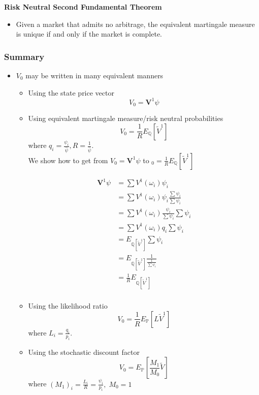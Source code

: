 \documentclass[11pt]{article}
\begin{document}
\textbf{Risk Neutral Second Fundamental Theorem}
\begin{itemize}
    \item Given a market that admits no arbitrage, the equivalent martingale measure is unique 
    if and only if the market is complete.
\end{itemize}

\subsubsection{Summary}

\begin{itemize}
    \item $V_0$ may be written in many equivalent manners 
    \begin{itemize}
        \item Using the state price vector 
        \[V_0 = \boldsymbol{V}^1 \psi\]
        \item Using equivalent martingale measure/risk neutral probabilities 
        \[V_0 = \frac{1}{R} E_{\mathbb{Q}}[\tilde{V}^1]\]
        where $q_i = \frac{\psi_i}{\hat{\psi}}, R = \frac{1}{\hat{\psi}}$. \\ 

        We show how to get from $V_0 = \boldsymbol{V}^1 \psi$ to $_0 = \frac{1}{R} 
        E_{\mathbb{Q}}[\tilde{V}^1]$

        \begin{align*}
            \boldsymbol{V}^1 \psi 
            &= \sum V^1(\omega_i) \psi_i \\
            &= \sum V^1(\omega_i) \psi_i \frac{\sum \psi_i}{\sum \psi_i} \\
            &= \sum V^1(\omega_i) \frac{\psi_i}{\sum \psi_i} \sum \psi_i \\
            &= \sum V^1(\omega_i) q_i \sum \psi_i \\
            &= E_{\mathbb{Q}[\tilde{V}^1]} \sum \psi_i \\
            &= E_{\mathbb{Q}[\tilde{V}^1]} \frac{1}{\frac{1}{\sum \psi_i}} \\
            &= \frac{1}{R} E_{\mathbb{Q}[\tilde{V}^1]} \\
        \end{align*}
        

        \item Using the likelihood ratio 
        \[V_0 = \frac{1}{R} E_{\mathbb{P}}[L\tilde{V}^1]\]
        where $L_i = \frac{q_i}{p_i}$.
        \item Using the stochastic discount factor 
        \[V_0 = E_{\mathbb{P}}\left[\frac{M_1}{M_0}\tilde{V}\right]\]
        where ${(M_1)}_i = \frac{L_i}{R} = \frac{\psi_i}{p_i}, \; M_0 = 1$
    \end{itemize}
    
\end{itemize}
\end{document}
